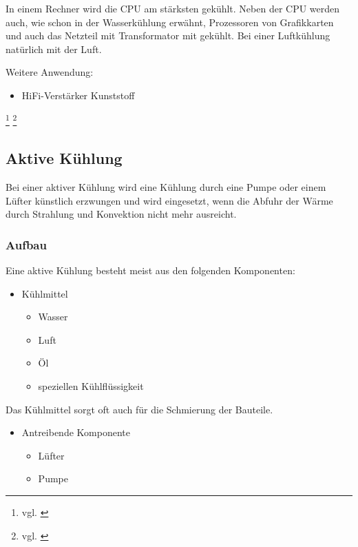 In einem Rechner wird die CPU am stärksten gekühlt. Neben der CPU werden auch, wie schon in der Wasserkühlung erwähnt, Prozessoren von Grafikkarten und auch das Netzteil mit Transformator mit gekühlt. Bei einer Luftkühlung natürlich mit der Luft.



Weitere Anwendung:
\begin{itemize}
	\item HiFi-Verstärker 
	 Kunststoff
\end{itemize}

\footnote{vgl. \cite{Luftkuehlung1}}
\footnote{vgl. \cite{Luftkuehlung2}}
\newpage


\subsection{Aktive Kühlung} 

Bei einer aktiver Kühlung wird eine Kühlung durch eine Pumpe oder einem Lüfter künstlich erzwungen und wird eingesetzt, wenn die Abfuhr der Wärme durch Strahlung und Konvektion nicht mehr ausreicht.

\subsubsection{Aufbau}

Eine aktive Kühlung besteht meist aus den folgenden Komponenten:

\begin{itemize}
	\item Kühlmittel
		\begin{itemize}
        	\item Wasser
         	\item Luft
         	\item Öl
         	\item speziellen Kühlflüssigkeit
     	\end{itemize}
\end{itemize}

Das Kühlmittel sorgt oft auch für die Schmierung der Bauteile. 

\begin{itemize}
     \item Antreibende Komponente
     	\begin{itemize}
        	\item Lüfter
         	\item Pumpe
     	\end{itemize}	
\end{itemize}

